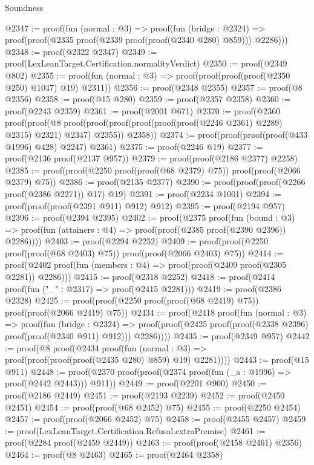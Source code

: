 \begin{lexlean}{Soundness}
\begin{coremodule}
@2347 := proof(fun (normal : @3) =>
    proof(fun (bridge : @2324) =>
      proof(proof(@2335 proof(@2339 proof(proof(@2340 @280) @859))) @2286)))
@2348 := proof(@2322 @2347)
@2349 := proof(LexLeanTarget.Certification.normalityVerdict)
@2350 := proof(@2349 @802)
@2355 := proof(fun (normal : @3) => proof(proof(proof(proof(@2350 @250) @1047) @19) @2311))
@2356 := proof(@2348 @2355)
@2357 := proof(@8 @2356)
@2358 := proof(@15 @280)
@2359 := proof(@2357 @2358)
@2360 := proof(@2243 @2359)
@2361 := proof(@2001 @671)
@2370 := proof(@2360
      proof(proof(@8
            proof(proof(proof(proof(proof(proof(@2246 @2361) @2289) @2315) @2321) @2347) @2355))
          @2358))
@2374 := proof(proof(proof(proof(@433 @1996) @428) @2247) @2361)
@2375 := proof(@2246 @19)
@2377 := proof(@2136 proof(@2137 @957))
@2379 := proof(proof(@2186 @2377) @2258)
@2385 := proof(proof(@2250 proof(proof(@68 @2379) @75)) proof(proof(@2066 @2379) @75))
@2386 := proof(@2135 @2377)
@2390 := proof(proof(proof(@2266 proof(@2386 @2271)) @17) @19)
@2391 := proof(@2234 @1001)
@2394 := proof(proof(proof(@2391 @911) @912) @912)
@2395 := proof(@2194 @957)
@2396 := proof(@2394 @2395)
@2402 := proof(@2375
      proof(fun (bound : @3) =>
        proof(fun (attainers : @4) => proof(proof(@2385 proof(@2390 @2396)) @2286))))
@2403 := proof(@2294 @2252)
@2409 := proof(proof(@2250 proof(proof(@68 @2403) @75)) proof(proof(@2066 @2403) @75))
@2414 := proof(@2402 proof(fun (members : @4) => proof(proof(@2409 proof(@2305 @2281)) @2286)))
@2415 := proof(@2318 @2252)
@2418 := proof(@2414 proof(fun ("_" : @2317) => proof(@2415 @2281)))
@2419 := proof(@2386 @2328)
@2425 := proof(proof(@2250 proof(proof(@68 @2419) @75)) proof(proof(@2066 @2419) @75))
@2434 := proof(@2418
      proof(fun (normal : @3) =>
        proof(fun (bridge : @2324) =>
          proof(proof(@2425 proof(proof(@2338 @2396) proof(proof(@2340 @911) @912))) @2286))))
@2435 := proof(@2349 @957)
@2442 := proof(@8
      proof(@2434
          proof(fun (normal : @3) => proof(proof(proof(proof(@2435 @280) @859) @19) @2281))))
@2443 := proof(@15 @911)
@2448 := proof(@2370 proof(proof(@2374 proof(fun (_a : @1996) => proof(@2442 @2443))) @911))
@2449 := proof(@2201 @900)
@2450 := proof(@2186 @2449)
@2451 := proof(@2193 @2239)
@2452 := proof(@2450 @2451)
@2454 := proof(proof(@68 @2452) @75)
@2455 := proof(@2250 @2454)
@2457 := proof(proof(@2066 @2452) @75)
@2458 := proof(@2455 @2457)
@2459 := proof(LexLeanTarget.Certification.Refusal.extraPremise)
@2461 := proof(@2284 proof(@2459 @2449))
@2463 := proof(proof(@2458 @2461) @2356)
@2464 := proof(@8 @2463)
@2465 := proof(@2464 @2358)

\end{coremodule}
\end{lexlean}
